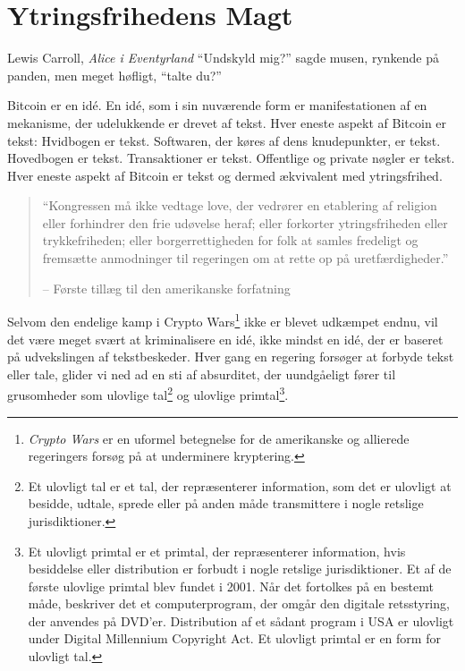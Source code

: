 
\chapter{Ytringsfrihedens Magt}
\label{les:6}

\begin{chapquote}{Lewis Carroll, \textit{Alice i Eventyrland}}
\enquote{Undskyld mig?} sagde musen, rynkende på panden, men meget høfligt, \enquote{talte du?}
\end{chapquote}

Bitcoin er en idé. En idé, som i sin nuværende form er manifestationen af en mekanisme, der udelukkende er drevet af tekst. Hver eneste aspekt af Bitcoin er tekst: Hvidbogen er tekst. Softwaren, der køres af dens knudepunkter, er tekst. Hovedbogen er tekst. Transaktioner er tekst. Offentlige og private nøgler er tekst. Hver eneste aspekt af Bitcoin er tekst og dermed ækvivalent med ytringsfrihed.

\begin{quotation}\begin{samepage}
\enquote{Kongressen må ikke vedtage love, der vedrører en etablering af religion
eller forhindrer den frie udøvelse heraf; eller forkorter ytringsfriheden eller
trykkefriheden; eller borgerrettigheden for folk at samles fredeligt og
fremsætte anmodninger til regeringen om at rette op på uretfærdigheder.}
\begin{flushright} -- Første tillæg til den amerikanske forfatning
\end{flushright}\end{samepage}\end{quotation}

Selvom den endelige kamp i Crypto Wars\footnote{\textit{Crypto Wars} er en uformel 
betegnelse for de amerikanske og allierede regeringers forsøg på at underminere 
kryptering.\cite{eff-cryptowars}\cite{wiki:cryptowars}} ikke er blevet udkæmpet endnu, 
vil det være meget svært at kriminalisere en idé, ikke mindst en idé, der er baseret på 
udvekslingen af tekstbeskeder. Hver gang en regering forsøger at forbyde tekst eller 
tale, glider vi ned ad en sti af absurditet, der uundgåeligt fører til grusomheder 
som ulovlige tal\footnote{Et ulovligt tal er et tal, der repræsenterer information, 
som det er ulovligt at besidde, udtale, sprede eller på anden måde transmittere i 
nogle retslige jurisdiktioner.\cite{wiki:illegal-number}} og ulovlige primtal\footnote{Et ulovligt primtal er et primtal, der repræsenterer information, hvis besiddelse eller distribution er forbudt i nogle retslige jurisdiktioner. Et af de første ulovlige primtal blev fundet i 2001. Når det fortolkes på en bestemt måde, beskriver det et computerprogram, der omgår den digitale retsstyring, der anvendes på DVD'er. Distribution af et sådant program i USA er ulovligt under Digital Millennium Copyright Act. Et ulovligt primtal er en form for ulovligt tal.\cite{wiki:illegal-prime}}.

